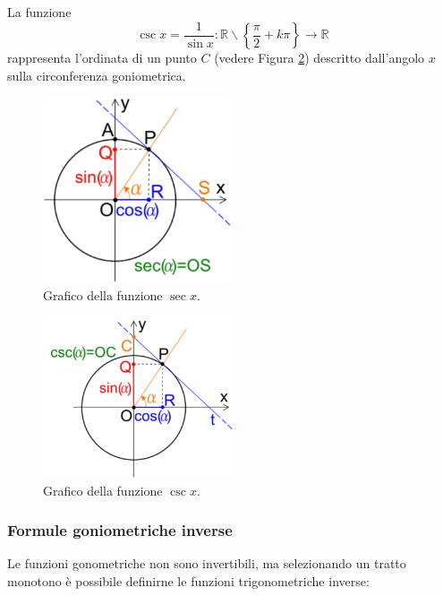 \begin{definition}[Cosecante]
    La funzione
    \begin{equation*}
        \csc x=\frac{1}{\sin x}\colon\mathbb R\backslash\left\{\frac{\pi}{2}+k\pi\right\}\rightarrow\mathbb R
    \end{equation*}
    rappresenta l'ordinata di un punto $C$ (vedere Figura \ref{fig:circonferenza_goniometrica_cosecante}) descritto dall'angolo $x$ sulla circonferenza goniometrica.
\end{definition}

\begin{figure}[!hbt]
    \centering
    \includegraphics[width=0.5\textwidth]{Analisi1/figures/circonferenza_goniometrica_secante.jpeg}
    \caption{Grafico della funzione $\sec x$.}
    \label{fig:circonferenza_goniometrica_secante}
\end{figure}

\begin{figure}[!hbt]
    \centering
    \includegraphics[width=0.5\textwidth]{Analisi1/figures/circonferenza_goniometrica_cosecante.jpeg}
    \caption{Grafico della funzione $\csc x$.}
    \label{fig:circonferenza_goniometrica_cosecante}
\end{figure}

\subsubsection{Formule goniometriche inverse}
Le funzioni gonometriche non sono invertibili, ma selezionando un tratto monotono è possibile definirne le funzioni trigonometriche inverse:

